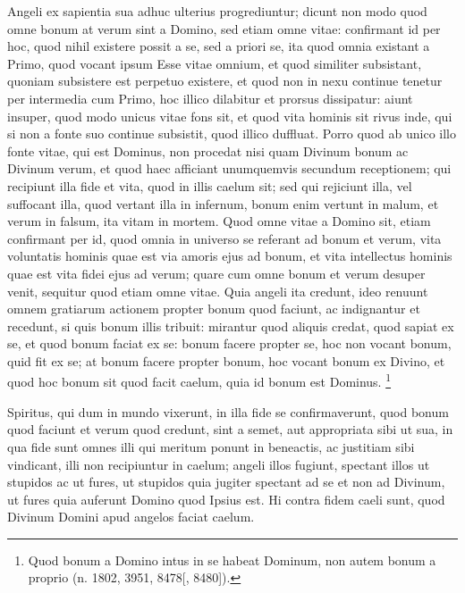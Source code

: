 \begin{topic}{9}
    Angeli ex sapientia sua adhuc ulterius progrediuntur; dicunt non modo quod omne bonum at verum sint a Domino, sed
    etiam omne vitae: confirmant id per hoc, quod nihil existere possit a se, sed a priori se, ita quod omnia existant a
    Primo, quod vocant ipsum Esse vitae omnium, et quod similiter subsistant, quoniam subsistere est perpetuo existere,
    et quod non in nexu continue tenetur per intermedia cum Primo, hoc illico dilabitur et prorsus dissipatur: aiunt
    insuper, quod modo unicus vitae fons sit, et quod vita hominis sit rivus inde, qui si non a fonte suo continue
    subsistit, quod illico duffluat.
    Porro quod ab unico illo fonte vitae, qui est Dominus, non procedat nisi quam Divinum bonum ac Divinum verum, et
    quod haec afficiant unumquemvis secundum receptionem; qui recipiunt illa fide et vita, quod in illis caelum sit; sed
    qui rejiciunt illa, vel suffocant illa, quod vertant illa in infernum, bonum enim vertunt in malum, et verum in
    falsum, ita vitam in mortem.
    Quod omne vitae a Domino sit, etiam confirmant per id, quod omnia in universo se referant ad bonum et verum, vita
    voluntatis hominis quae est via amoris ejus ad bonum, et vita intellectus hominis quae est vita fidei ejus ad verum;
    quare cum omne bonum et verum desuper venit, sequitur quod etiam omne vitae.
    Quia angeli ita credunt, ideo renuunt omnem gratiarum actionem propter bonum quod faciunt, ac indignantur et
    recedunt, si quis bonum illis tribuit: mirantur quod aliquis credat, quod sapiat ex se, et quod bonum faciat ex se:
    bonum facere propter se, hoc non vocant bonum, quid fit ex se; at bonum facere propter bonum, hoc vocant bonum ex
    Divino, et quod hoc bonum sit quod facit caelum, quia id bonum est Dominus.
    \footnote{
        Quod bonum a Domino intus in se habeat Dominum, non autem bonum a proprio (n. 1802, 3951, 8478[, 8480]).
    }
\end{topic}

\begin{topic}{10}
    Spiritus, qui dum in mundo vixerunt, in illa fide se confirmaverunt, quod bonum quod faciunt et verum quod credunt,
    sint a semet, aut appropriata sibi ut sua, in qua fide sunt omnes illi qui meritum ponunt in beneactis, ac justitiam
    sibi vindicant, illi non recipiuntur in caelum; angeli illos fugiunt, spectant illos ut stupidos ac ut fures, ut
    stupidos quia jugiter spectant ad se et non ad Divinum, ut fures quia auferunt Domino quod Ipsius est.
    Hi contra fidem caeli sunt, quod Divinum Domini apud angelos faciat caelum.
\end{topic}

